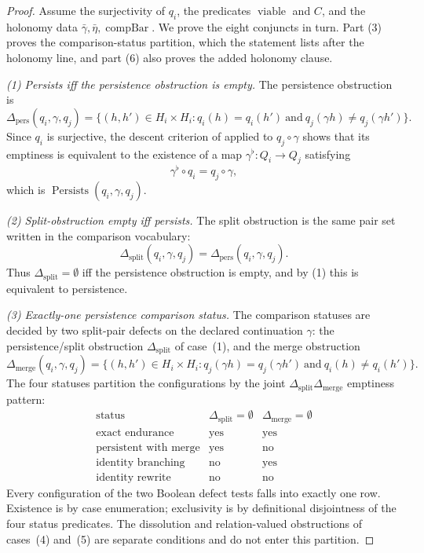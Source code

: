 \begin{proof}
Assume the surjectivity of \(q_i\), the predicates
\(\operatorname{viable}\) and \(C\), and the holonomy data
\(\bar\gamma,\bar\eta,\operatorname{compBar}\).  We prove the eight
conjuncts in turn. Part (3) proves the comparison-status partition, which the statement lists after the holonomy line, and part (6) also proves the added holonomy clause.

\emph{(1) Persists iff the persistence obstruction is empty.}
The persistence obstruction is
\[
  \Delta_{\mathrm{pers}}(q_i,\gamma,q_j)
  =
  \{(h,h')\in H_i\times H_i:
      q_i(h)=q_i(h')\ \text{and}\
      q_j(\gamma h)\ne q_j(\gamma h')\}.
\]
Since \(q_i\) is surjective, the descent criterion of
 applied to \(q_j\circ\gamma\) shows that its
emptiness is equivalent to the existence of a map
\(\gamma^{\flat}:Q_i\to Q_j\) satisfying
\[
  \gamma^{\flat}\circ q_i=q_j\circ\gamma,
\]
which is \(\operatorname{Persists}(q_i,\gamma,q_j)\).

\emph{(2) Split-obstruction empty iff persists.}
The split obstruction is the same pair set written in the comparison
vocabulary:
\[
  \Delta_{\mathrm{split}}(q_i,\gamma,q_j)
  =
  \Delta_{\mathrm{pers}}(q_i,\gamma,q_j).
\]
Thus \(\Delta_{\mathrm{split}}=\emptyset\) iff the persistence
obstruction is empty, and by (1) this is equivalent to persistence.

\emph{(3) Exactly-one persistence comparison status.}
The comparison statuses are decided by two split-pair defects on the
declared continuation \(\gamma\): the persistence/split obstruction
\(\Delta_{\mathrm{split}}\) of case~(1), and the merge obstruction
\[
  \Delta_{\mathrm{merge}}(q_i,\gamma,q_j)
  =
  \{(h,h')\in H_i\times H_i:
      q_j(\gamma h)=q_j(\gamma h')\ \text{and}\ q_i(h)\ne q_i(h')\}.
\]
The four statuses partition the configurations by the joint
\(\Delta_{\mathrm{split}}\)\textendash{}\(\Delta_{\mathrm{merge}}\)
emptiness pattern:
\[
\begin{array}{c|c|c}
\text{status} & \Delta_{\mathrm{split}}=\emptyset
  & \Delta_{\mathrm{merge}}=\emptyset\\
\hline
\text{exact endurance} & \text{yes} & \text{yes}\\
\text{persistent with merge} & \text{yes} & \text{no}\\
\text{identity branching} & \text{no} & \text{yes}\\
\text{identity rewrite} & \text{no} & \text{no}
\end{array}
\]
Every configuration of the two Boolean defect tests falls into
exactly one row.  Existence is by case enumeration; exclusivity is by
definitional disjointness of the four status predicates.  The
dissolution and relation-valued obstructions of cases~(4) and~(5) are
separate conditions and do not enter this partition.


\end{proof}
